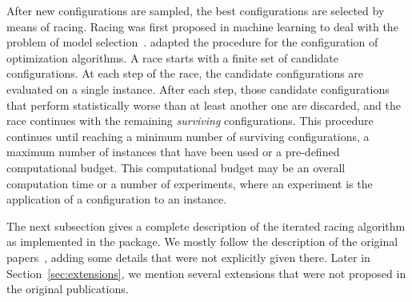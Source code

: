 \documentclass[article,a4paper,nojss,notitle]{jss}
\newcommand{\irace}{\pkg{irace}\xspace}
\newcommand{\FRACE}{\text{F-Race}\xspace}
\newcommand{\IFRACE}{\text{I/F-Race}\xspace}
\begin{document}
After new configurations are sampled, the best configurations are
selected by means of racing. Racing was first proposed in machine
learning to deal with the problem of model
selection~\citep{MarMoo1997air}.  \citet{BirStuPaqVar02:gecco} adapted
the procedure for the configuration of optimization algorithms. A race
starts with a finite set of candidate  configurations. At
each step of the race, the candidate configurations are evaluated on a
single instance. After each step, those candidate configurations that
perform statistically worse than at least another one are discarded,
and the race continues with the remaining \emph{surviving}
configurations. This procedure continues until reaching a minimum
number of surviving configurations, a maximum number of instances that
have been used or a pre-defined computational budget. This
computational budget may be an overall computation time or a number of
experiments, where an experiment is the application of a
configuration to an instance.

The next subsection gives a complete description of the iterated
racing algorithm as implemented in the \irace package. We mostly
follow the description of the original
papers~\citep{BalBirStu07,BirYuaBal2010:emaoa}, adding some details
that were not explicitly given there. Later in
Section~\ref{sec:extensions}, we mention several extensions that were
not proposed in the original publications.




\end{document}

